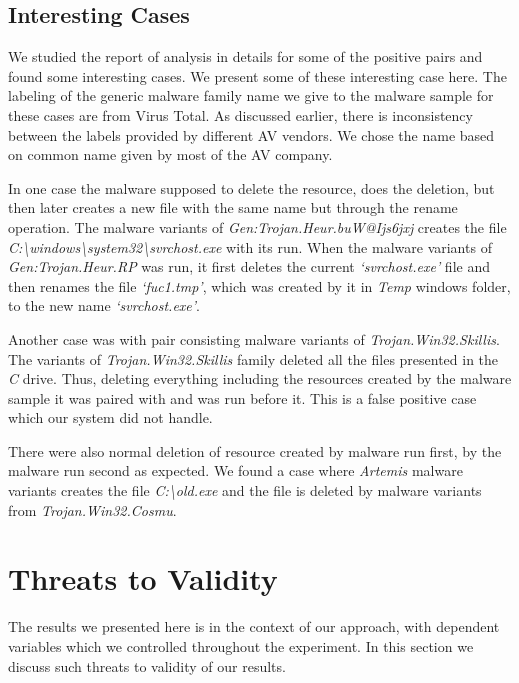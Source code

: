 \subsection{Interesting Cases}
\label{sub:Interesting Cases}
We studied the report of analysis in details for some of the positive pairs and found some interesting cases.
We present some of these interesting case here.
The labeling of the generic malware family name we give to the malware sample for these cases are from Virus Total.
As discussed earlier, there is inconsistency between the labels provided by different AV vendors.
We chose the name based on common name given by most of the AV company.

In one case the malware supposed to delete the resource, does the deletion, but then later creates a new file with the same name but through the rename operation.
The malware variants of \emph{Gen:Trojan.Heur.buW@Ijs6jxj} creates the file \emph{C:\textbackslash windows\textbackslash system32\textbackslash svrchost.exe} with its run. %
When the malware variants of \emph{Gen:Trojan.Heur.RP} was run, it first deletes the current \emph{`svrchost.exe'} file and then renames the file \emph{`fuc1.tmp'}, which was created by it in \emph{Temp} windows folder, to the new name \emph{`svrchost.exe'}.

Another case was with pair consisting malware variants of \emph{Trojan.Win32.Skillis}.
The variants of \emph{Trojan.Win32.Skillis} family deleted all the files presented in the \emph{C} drive.
Thus, deleting everything including the resources created by the malware sample it was paired with and was run before it.
This is a false positive case which our system did not handle.

There were also normal deletion of resource  created by malware run first, by the malware run second as expected.
We found a case where \emph{Artemis} malware variants creates the file \emph{C:\textbackslash old.exe} and the file is deleted by malware variants from \emph{Trojan.Win32.Cosmu}.
\section{Threats to Validity}
\label{sec:Threats to Validity}
The results we presented here is in the context of our approach, with dependent variables which we controlled throughout the experiment.
In this section we discuss such threats to validity of our results.

